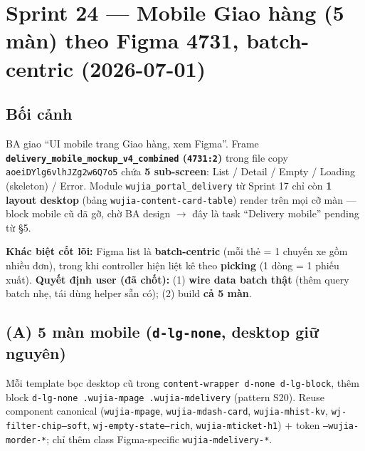 \chapter{Sprint 24 --- Mobile Giao hàng (5 màn) theo Figma 4731, batch-centric (2026-07-01)}

\section{Bối cảnh}

BA giao ``UI mobile trang Giao hàng, xem Figma''. Frame \textbf{\texttt{delivery\_mobile\_mockup\_v4\_combined} (\texttt{4731:2})} trong file copy \texttt{aoeiDYlg6vlhJZg2w6Q7o5} chứa \textbf{5 sub-screen}: List / Detail / Empty / Loading (skeleton) / Error. Module \texttt{wujia\_portal\_delivery} từ Sprint 17 chỉ còn \textbf{1 layout desktop} (bảng \texttt{wujia-content-card-table}) render trên mọi cỡ màn --- block mobile cũ đã gỡ, chờ BA design \(\rightarrow\) đây là task ``Delivery mobile'' pending từ §5.

\textbf{Khác biệt cốt lõi:} Figma list là \textbf{batch-centric} (mỗi thẻ = 1 chuyến xe gồm nhiều đơn), trong khi controller hiện liệt kê theo \textbf{picking} (1 dòng = 1 phiếu xuất). \textbf{Quyết định user (đã chốt):} (1) \textbf{wire data batch thật} (thêm query batch nhẹ, tái dùng helper sẵn có); (2) build \textbf{cả 5 màn}.

\section{(A) 5 màn mobile (\texttt{d-lg-none}, desktop giữ nguyên)}

Mỗi template bọc desktop cũ trong \texttt{content-wrapper d-none d-lg-block}, thêm block \texttt{d-lg-none .wujia-mpage .wujia-mdelivery} (pattern S20). Reuse component canonical (\texttt{wujia-mpage}, \texttt{wujia-mdash-card}, \texttt{wujia-mhist-kv}, \texttt{wj-filter-chip--soft}, \texttt{wj-empty-state--rich}, \texttt{wujia-mticket-h1}) + token \texttt{--wujia-morder-*}; chỉ thêm class Figma-specific \texttt{wujia-mdelivery-*}.

